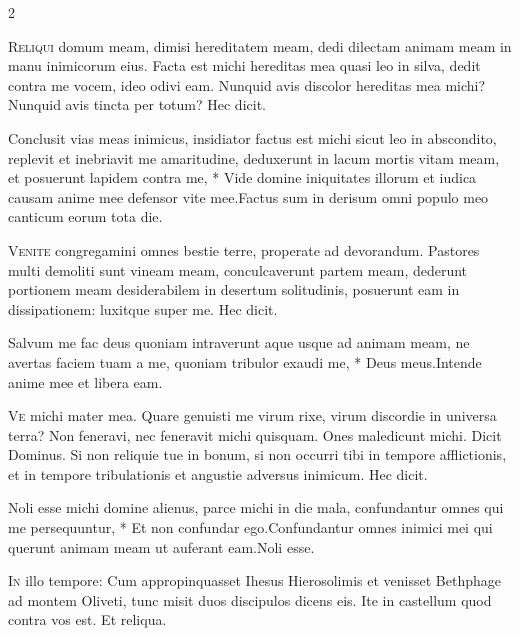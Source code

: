 \begin{multicols*}{2}
\begin{responsory}
\end{responsory}%
\lettrine[lines=2]{\zallmancaps \color{Red} R}{eliqui} domum meam, dimisi hereditatem meam, dedi dilectam animam meam in manu inimicorum eius. Facta est michi hereditas mea quasi leo in silva, dedit contra me vocem, ideo odivi eam. Nunquid avis discolor hereditas mea michi? Nunquid avis tincta per totum? Hec dicit.
\begin{responsory}
{Conclusit vias meas inimicus, insidiator factus est michi sicut leo in abscondito, replevit et inebriavit me amaritudine, deduxerunt in lacum mortis vitam meam, et posuerunt lapidem contra me, * Vide domine iniquitates illorum et iudica causam anime mee defensor vite mee.}{Factus sum in derisum omni populo meo canticum eorum tota die.}
\end{responsory}%
\lettrine[lines=2]{\zallmancaps \color{Blue} V}{enite} congregamini omnes bestie terre, properate ad devorandum. Pastores multi demoliti sunt vineam meam, conculcaverunt partem meam, dederunt portionem meam desiderabilem in desertum solitudinis, posuerunt eam in dissipationem: luxitque super me. Hec dicit.
\begin{responsory}
{Salvum me fac deus quoniam intraverunt aque usque ad animam meam, ne avertas faciem tuam a me, quoniam tribulor exaudi me, * Deus meus.}{Intende anime mee et libera eam.}
\end{responsory}%
\lettrine[lines=2]{\zallmancaps \color{Red} V}{e} michi mater mea. Quare genuisti me virum rixe, virum discordie in universa terra? Non feneravi, nec feneravit michi quisquam. Ones maledicunt michi. Dicit Dominus. Si non reliquie tue in bonum, si non occurri tibi in tempore afflictionis, et in tempore tribulationis et angustie adversus inimicum. Hec dicit.
\begin{responsory}
{Noli esse michi domine alienus, parce michi in die mala, confundantur omnes qui me persequuntur, * Et non confundar ego.}{Confundantur omnes inimici mei qui querunt animam meam ut auferant eam.}Noli esse.
\end{responsory}%
\lettrine[lines=2]{\zallmancaps \color{Blue} I}{n} illo tempore: Cum appropinquasset Ihesus Hierosolimis et venisset Bethphage ad montem Oliveti, tunc misit duos discipulos dicens eis. Ite in castellum quod contra vos est. Et reliqua.

\end{multicols*}
